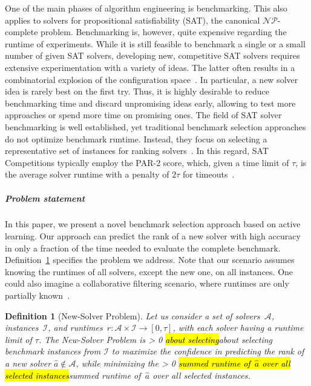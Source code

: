\documentclass[sn-basic, Numbered]{sn-jnl} %
\newtheorem{definition}{Definition} %
\newcommand{\showchanges}{1} %
\newcommand{\change}[1]{\ifnum \showchanges > 0 \sethlcolor{yellow}\hl{#1}\else#1\fi}
\begin{document}
One of the main phases of algorithm engineering is benchmarking.
This also applies to solvers for propositional satisfiability (SAT), the canonical $\mathcal{NP}$-complete problem.
Benchmarking is, however, quite expensive regarding the runtime of experiments.
While it is still feasible to benchmark a single or a small number of given SAT solvers, developing new, competitive SAT solvers requires extensive experimentation with a variety of ideas.
The latter often results in a combinatorial explosion of the configuration space~\cite{HutterHL11}.
In particular, a new solver idea is rarely best on the first try.
Thus, it is highly desirable to reduce benchmarking time and discard unpromising ideas early, allowing to test more approaches or spend more time on promising ones.
The field of SAT solver benchmarking is well established, yet traditional benchmark selection approaches do not optimize benchmark runtime.
Instead, they focus on selecting a representative set of instances for ranking solvers~\cite{Gelder11,HoosKSS13}.
In this regard, SAT Competitions typically employ the \mbox{PAR-2} score, which, given a time limit of $\tau$, is the average solver runtime with a penalty of $2 \tau$ for timeouts~\cite{FroleyksHIJS21}.

\subparagraph{Problem statement}

In this paper, we present a novel benchmark selection approach based on active learning.
Our approach can predict the rank of a new solver with high accuracy in only a fraction of the time needed to evaluate the complete benchmark.
Definition~\ref{def:new-solver-problem} specifies the problem we address.
Note that our scenario assumes knowing the runtimes of all solvers, except the new one, on all instances.
One could also imagine a collaborative filtering scenario, where runtimes are only partially known~\cite{misir2017data,misir2017alors}.

\begin{definition}[New-Solver Problem]
  Let us consider a set of solvers~$\mathcal{A}$, instances~$\mathcal{I}$, and runtimes~${r\!: \mathcal{A} \times \mathcal{I} \rightarrow \left[0, \tau\right]}$, with each solver having a runtime limit of $\tau$.
  The \emph{New-Solver Problem} is \change{about selecting} benchmark instances from $\mathcal{I}$ to maximize the confidence in predicting the rank of a new solver $\hat{a} \notin \mathcal{A}$, while minimizing the \change{summed runtime of~$\hat{a}$ over all selected instances}.
  \label{def:new-solver-problem}
\end{definition}
\end{document}
